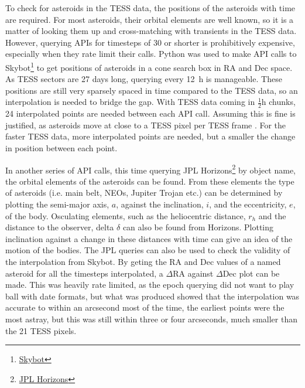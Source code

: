 \documentclass[12pt]{article}
\begin{document}
To check for asteroids in the TESS data, the positions of the asteroids with time are required.
For most asteroids, their orbital elements are well known, so it is a matter of looking them up and cross-matching with transients in the TESS data.
However, querying APIs for timesteps of \qty{30}{\min} or shorter is prohibitively expensive, especially when they rate limit their calls.
Python was used to make API calls to {Skybot}\footnote{\href{https://vo.imcce.fr/webservices/skybot/}{Skybot}} to get positions of asteroids in a cone search box in RA and Dec space.
As TESS sectors are 27%
days long, querying every \qty{12}{\hour} is manageable.
These positions are still very sparsely spaced in time compared to the TESS data, so an interpolation is needed to bridge the gap.
With TESS data coming in $\frac12\unit{\hour}$ chunks, 24 interpolated points are needed between each API call.
Assuming this is fine is justified, as asteroids move at close to a TESS pixel per TESS frame \citep{Pal2018,Pal2020}.
For the faster TESS data, more interpolated points are needed, but a smaller the change in position between each point.


In another series of API calls, this time querying {JPL Horizons}\footnote{\href{https://ssd.jpl.nasa.gov/horizons/}{JPL Horizons}} by object name, the orbital elements of the asteroids can be found.
From these elements the type of asteroids (i.e. main belt, NEOs, Jupiter Trojan etc.) can be determined by plotting the semi-major axis, $a$, against the inclination, $i$, and the eccentricity, $e$, of the body.
Osculating elements, such as the heliocentric distance, $r_h$ and the distance to the observer, delta $\delta$%
can also be found from Horizons.
Plotting inclination against a change in these distances with time can give an idea of the motion of the bodies.
The JPL queries can also be used to check the validity of the interpolation from Skybot.
By geting the RA and Dec values of a named asteroid for all the timesteps interpolated, a $\Delta$RA against $\Delta$Dec plot can be made.
This was heavily rate limited, as the epoch querying did not want to play ball with date formats, but what was produced showed that the interpolation was accurate to within an arcsecond most of the time, the earliest points were the most astray, but this was still within three or four arcseconds, much smaller than the \qty{21}{\arcsec} TESS pixels.

\end{document}
